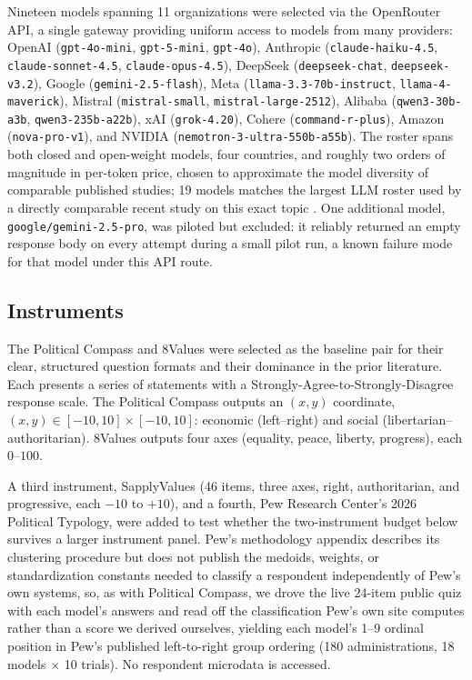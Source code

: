 \documentclass[12pt]{article}
\begin{document}
Nineteen models spanning 11 organizations were selected via the OpenRouter
API, a single gateway providing uniform access to models from many
providers: OpenAI \citep{openai2023} (\texttt{gpt-4o-mini},
\texttt{gpt-5-mini}, \texttt{gpt-4o}), Anthropic \citep{anthropic2023}
(\texttt{claude-haiku-4.5}, \texttt{claude-sonnet-4.5},
\texttt{claude-opus-4.5}), DeepSeek \citep{deepseek2025}
(\texttt{deepseek-chat}, \texttt{deepseek-v3.2}), Google
(\texttt{gemini-2.5-flash}), Meta (\texttt{llama-3.3-70b-instruct},
\texttt{llama-4-maverick}), Mistral (\texttt{mistral-small},
\texttt{mistral-large-2512}), Alibaba (\texttt{qwen3-30b-a3b},
\texttt{qwen3-235b-a22b}), xAI (\texttt{grok-4.20}), Cohere
(\texttt{command-r-plus}), Amazon (\texttt{nova-pro-v1}), and NVIDIA
(\texttt{nemotron-3-ultra-550b-a55b}). The roster spans both closed and
open-weight models, four countries, and roughly two orders of magnitude in
per-token price, chosen to approximate the model diversity of comparable
published studies; 19 models matches the largest LLM roster used by a
directly comparable recent study on this exact topic \citep{buyl2026}. One
additional model, \texttt{google/gemini-2.5-pro}, was piloted but excluded:
it reliably returned an empty response body on every attempt during a
small pilot run, a known failure mode for that model under this API route.

\subsection{Instruments}

The Political Compass and 8Values \citep{politicalcompass_nd,
values8_2019} were selected as the baseline pair for their clear,
structured question formats and their dominance in the prior literature.
Each presents a series of statements with a Strongly-Agree-to-Strongly-Disagree
response scale. The Political Compass outputs an $(x,y)$ coordinate,
$(x,y)\in[-10,10]\times[-10,10]$: economic (left--right) and social
(libertarian--authoritarian). 8Values outputs four axes (equality, peace,
liberty, progress), each $0$--$100$.

A third instrument, SapplyValues (46 items, three axes, right,
authoritarian, and progressive, each $-10$ to $+10$), and a fourth, Pew
Research Center's 2026 Political Typology, were added to test whether the
two-instrument budget below survives a larger instrument panel. Pew's
methodology appendix describes its clustering procedure but does not
publish the medoids, weights, or standardization constants needed to
classify a respondent independently of Pew's own systems, so, as with
Political Compass, we drove the live 24-item public quiz with each model's
answers and read off the classification Pew's own site computes rather
than a score we derived ourselves, yielding each model's 1--9 ordinal
position in Pew's published left-to-right group ordering (180
administrations, 18 models $\times$ 10 trials). No respondent microdata is
accessed.
\end{document}
